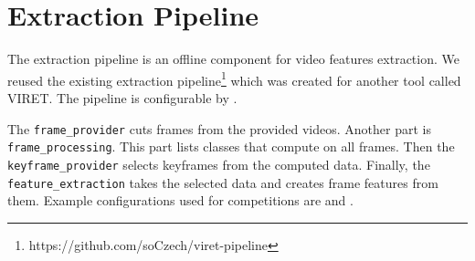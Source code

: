 \chapter{Extraction Pipeline}
\label{extraction-pipeline}


The extraction pipeline is an offline component for video features extraction. We reused the existing extraction pipeline\footnote{https://github.com/soCzech/viret-pipeline} which was created for another tool called VIRET. The pipeline is configurable by . 

The \lstinline{frame_provider} cuts frames from the provided videos. Another part is \lstinline{frame_processing}. This part lists classes that compute on all frames. Then the \lstinline{keyframe_provider} selects keyframes from the computed data. Finally, the \lstinline{feature_extraction} takes the selected data and creates frame features from them. Example configurations used for competitions are  and .
